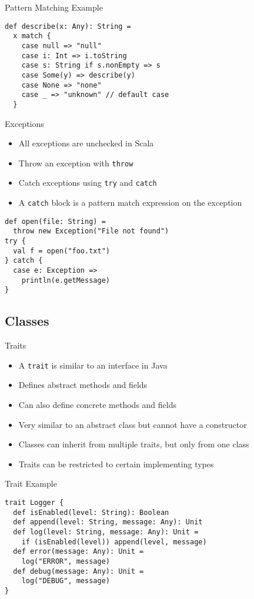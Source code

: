 \documentclass{beamer}
\begin{document}
\begin{frame}[fragile]{Pattern Matching Example}
\begin{lstlisting}
def describe(x: Any): String =
  x match {
    case null => "null"
    case i: Int => i.toString
    case s: String if s.nonEmpty => s
    case Some(y) => describe(y)
    case None => "none"
    case _ => "unknown" // default case
  }
\end{lstlisting}
\end{frame}

\begin{frame}[fragile]{Exceptions}
\begin{itemize}
\item All exceptions are unchecked in Scala
\item Throw an exception with \lstinline{throw}
\item Catch exceptions using \lstinline{try} and \lstinline{catch}
\item A \lstinline{catch} block is a pattern match expression on the exception
\end{itemize}
\begin{lstlisting}
def open(file: String) =
  throw new Exception("File not found")
try {
  val f = open("foo.txt")
} catch {
  case e: Exception =>
    println(e.getMessage)
}
\end{lstlisting}
\end{frame}


\subsection{Classes}

\begin{frame}{Traits}
\begin{itemize}
\item A \lstinline{trait} is similar to an interface in Java
\item Defines abstract methods and fields
\item Can also define concrete methods and fields
\item Very similar to an abstract class but cannot have a constructor
\item Classes can inherit from multiple traits, but only from one class
\item Traits can be restricted to certain implementing types
\end{itemize}
\end{frame}

\begin{frame}[fragile]{Trait Example}
\begin{lstlisting}
trait Logger {
  def isEnabled(level: String): Boolean
  def append(level: String, message: Any): Unit
  def log(level: String, message: Any): Unit =
    if (isEnabled(level)) append(level, message)
  def error(message: Any): Unit =
    log("ERROR", message)
  def debug(message: Any): Unit =
    log("DEBUG", message)
}
\end{lstlisting}
\end{frame}
\end{document}
